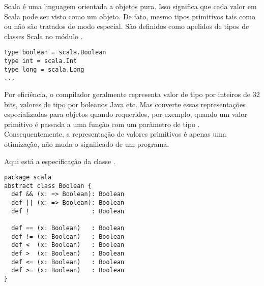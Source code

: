 Scala \'{e} uma linguagem orientada a objetos pura. Isso significa que cada valor 
em Scala pode ser visto como um objeto. De fato, mesmo tipos primitivos tais como 
 ou  n\~{a}o s\~{a}o tratados de modo especial. S\~{a}o definidos
como apelidos de tipos de classes Scala no m\'{o}dulo .  
\begin{lstlisting}
type boolean = scala.Boolean
type int = scala.Int
type long = scala.Long
...
\end{lstlisting}

Por efici\^{e}ncia, o compilador geralmente representa valor de tipo
 por inteiros de 32 bits, valores de tipo 
por boleanos Java etc. Mas converte essas representa\c{c}\~{o}es especializadas para 
objetos quando requeridos, por exemplo, quando um valor primitivo  \'{e} 
passada a uma fun\c{c}\~{a}o com um par\^{a}metro de tipo . Consequentemente, a
representa\c{c}\~{a}o de valores primitivos \'{e} apenas uma otimiza\c{c}\~{a}o, n\~{a}o muda o significado
de um programa.

Aqui est\'{a} a especifica\c{c}\~{a}o da classe .
\begin{lstlisting}
package scala
abstract class Boolean {
  def && (x: => Boolean): Boolean
  def || (x: => Boolean): Boolean
  def !                 : Boolean

  def == (x: Boolean)   : Boolean
  def != (x: Boolean)   : Boolean
  def <  (x: Boolean)   : Boolean
  def >  (x: Boolean)   : Boolean
  def <= (x: Boolean)   : Boolean
  def >= (x: Boolean)   : Boolean
}
\end{lstlisting}

